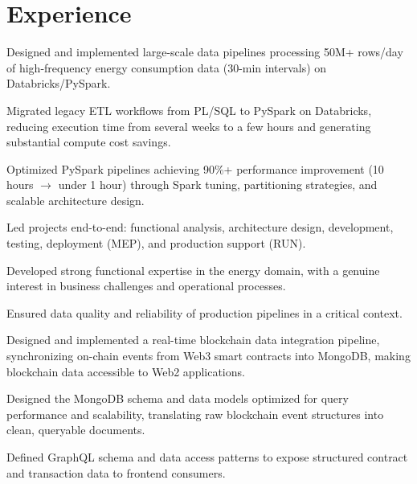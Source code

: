 \documentclass[english]{plushcv}
\begin{document}
\begin{minipage}[t]{0.74\textwidth}

\section{Experience}

\hfill
{}
\vspace{\topsep}
\begin{tightemize}
\sectionsep
\item Designed and implemented large-scale data pipelines processing 50M+ rows/day of high-frequency energy consumption data (30-min intervals) on Databricks/PySpark.
\item Migrated legacy ETL workflows from PL/SQL to PySpark on Databricks, reducing execution time from several weeks to a few hours and generating substantial compute cost savings.
\item Optimized PySpark pipelines achieving 90\%+ performance improvement (10 hours $\rightarrow$ under 1 hour) through Spark tuning, partitioning strategies, and scalable architecture design.
\item Led projects end-to-end: functional analysis, architecture design, development, testing, deployment (MEP), and production support (RUN).
\item Developed strong functional expertise in the energy domain, with a genuine interest in business challenges and operational processes.
\item Ensured data quality and reliability of production pipelines in a critical context.
\end{tightemize}
\sectionsep
\sectionsep

\hfill
{}
\vspace{5pt}
\begin{tightemize}
\sectionsep
\item Designed and implemented a real-time blockchain data integration pipeline, synchronizing on-chain events from Web3 smart contracts into MongoDB, making blockchain data accessible to Web2 applications.
\item Designed the MongoDB schema and data models optimized for query performance and scalability, translating raw blockchain event structures into clean, queryable documents.
\item Defined GraphQL schema and data access patterns to expose structured contract and transaction data to frontend consumers.
\end{tightemize}
\sectionsep
\sectionsep


\end{minipage}
\end{document}
